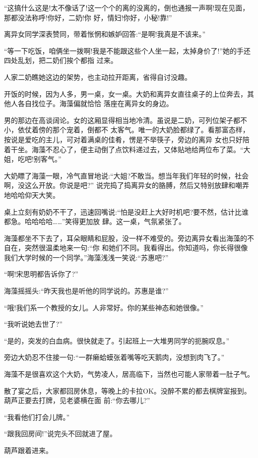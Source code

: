 \documentclass[11pt,a4paper,onecolumn]{article}
\begin{document}
``这搞什么这是!太不像话了!这一个个的离的没离的，倒也通报一声啊!现在见面，那都没法称呼!你好，二奶!你
好，情妇!你好，小秘!靠!''

离异女同学深表赞同，带着怅惘和嫉妒回答:``是啊!我真是不该来。''

``等一下吃饭，咱俩坐一拨啊!我是不能跟这些个人坐一起，太掉身价了!''她的手还四处乱划，把二奶们挨个都指
过来。

人家二奶瞧她这边的架势，也主动拉开距离，省得自讨没趣。

开饭的时候，因为人多，男一桌，女一桌。大奶和离异女直往桌子的上位奔去，其他人各自找位子。海藻偏就恰恰
落座在离异女的身边。

男的那边在高谈阔论。女的这厢显得相当地冷清。虽说是二奶，可列位架子都不小，依仗着傍的那个宠着，倒都不
太客气。唯一的大奶脸都绿了。看那富态样，按说是爱吃的主儿，可对着满桌的佳肴，愣是不举筷子，旁边的离异
女也只好陪着干坐。海藻不忍心了，便主动倒了点饮料递过去，又体贴地给两位布了菜。``大姐，吃吧!别客气。''

大奶瞟了海藻一眼，冷气直冒地说:``大姐?不敢当。想当年我们年轻的时候，社会啊，没这么开放。你说是吧?''
说完捣了捣离异女的胳膊，然后又特别放肆和嘲弄地哈哈仰天大笑。

桌上立刻有奶奶不干了，迅速回嘴说:``怕是没赶上大好时机吧?要不然，估计比谁都急。哈哈哈哈……''笑得更加放
肆。这一桌，气氛紧张了。

海藻都坐不下去了，耳朵眼睛和屁股，没一样不难受的。旁边离异女看出海藻的不自在，突然很温柔地来一句:``你
和她们不同。我看得出。你知道吗，你长得很像我们大学时候的一个同学。''海藻浅浅一笑说:``苏惠吧?''

``啊!宋思明都告诉你了?''

海藻摇摇头:``昨天我也是听他的同学说的。苏惠是谁?''

``哦!我们系一个教授的女儿。人非常好。你的某些神态和她很像。''

``我听说她去世了?''

``是的，突发的白血病。很快就走了。引起班上一大堆男同学的扼腕叹息。''

旁边大奶忍不住接一句:``一群癞蛤蟆张着嘴等吃天鹅肉，没想到肉飞了。''

海藻不是很喜欢这个大奶，气势凌人，居高临下，当然也可能人家带着一肚子气。

散了宴之后，大家都回房休息，等晚上的卡拉OK。没醉不累的都去棋牌室报到。葫芦正要去打牌，见老婆横在面
前:``你去哪儿?''

``我看他们打会儿牌。''

``跟我回房间!''说完头不回就进了屋。

葫芦跟着进来。
\end{document}
